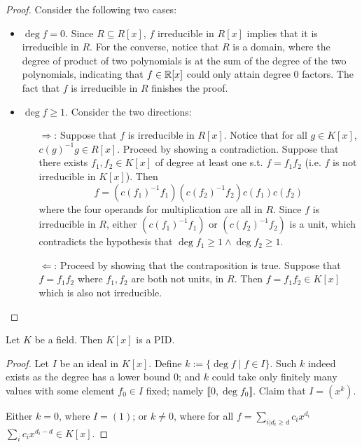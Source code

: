 \documentclass{article}
\begin{document}
\begin{proof}
    Consider the following two cases:
    \begin{itemize}
        \item $\deg f = 0$. Since $R\subseteq R[x]$, $f$ irreducible in $R[x]$ implies that it is irreducible in $R$. For the converse, notice that $R$ is a domain, where the degree of product of two polynomials is at the sum of the degree of the two polynomials, indicating that $f\in\mathbb{R}[x]$ could only attain degree 0 factors. The fact that $f$ is irreducible in $R$ finishes the proof.
        \item $\deg f \geq 1$. Consider the two directions:
            \begin{itemize}
                \item[$\Rightarrow$:] Suppose that $f$ is irreducible in $R[x]$. Notice that for all $g\in K[x]$, $c(g)^{-1} g\in R[x]$. Proceed by showing a contradiction. Suppose that there exists $f_1, f_2\in K[x]$ of degree at least one s.t. $f = f_1 f_2$ (i.e. $f$ is not irreducible in $K[x]$). Then
                $$
                    f = (c(f_1)^{-1} f_1) (c(f_2)^{-1} f_2) c(f_1) c(f_2)
                $$
                where the four operands for multiplication are all in $R$. Since $f$ is irreducible in $R$, either $(c(f_1)^{-1} f_1)$ or $(c(f_2)^{-1} f_2)$ is a unit, which contradicts the hypothesis that $\deg f_1 \geq 1 \wedge \deg f_2 \geq 1$.
                \item[$\Leftarrow$:] Proceed by showing that the contraposition is true. Suppose that $f = f_1 f_2$ where $f_1, f_2$ are both not units, in $R$. Then $f = f_1 f_2 \in K[x]$ which is also not irreducible.
            \end{itemize}
    \end{itemize}
\end{proof}

\begin{lemma}\label{lem:K[x] PID}
    Let $K$ be a field. Then $K[x]$ is a PID.
\end{lemma}

\begin{proof}
    Let $I$ be an ideal in $K[x]$. Define $k := \{ \deg f \mid f\in I \}$. Such $k$ indeed exists as the degree has a lower bound $0$; and $k$ could take only finitely many values with some element $f_0\in I$ fixed; namely $\llbracket 0, \deg f_0 \rrbracket$. Claim that $I = (x^k)$.

    Either $k = 0$, where $I = (1)$; or $k \neq 0$, where for all $f = \sum\limits_{i|d_i\geq d} c_i x^{d_i}$ $\sum\limits_{i} c_i x^{d_i - d} \in K[x]$. 
\end{proof}
\end{document}
